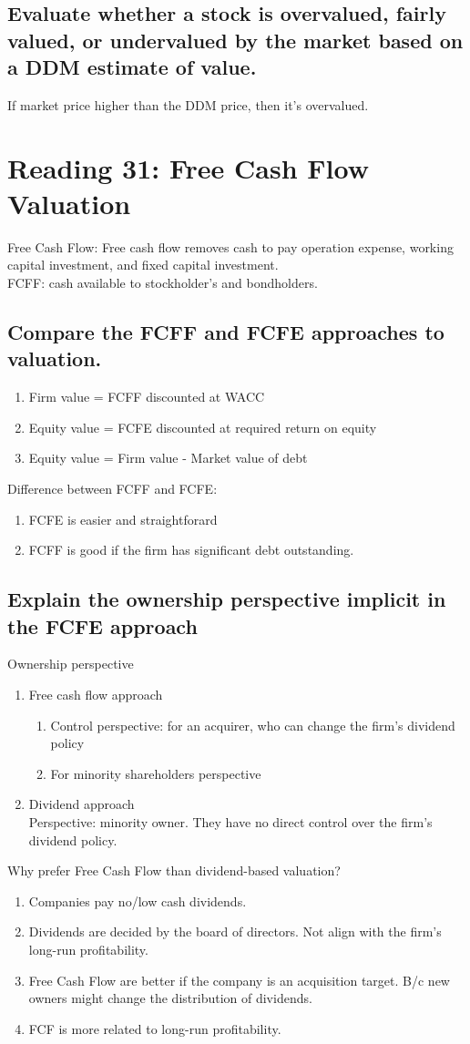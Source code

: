 \documentclass{article}
\newcommand{\be}{\begin{enumerate}}
\newcommand{\ee}{\end{enumerate}}
\begin{document}
\subsection{Evaluate whether a stock is overvalued, fairly valued, or undervalued by the
market based on a DDM estimate of value.}
If market price higher than the DDM price, then it's overvalued. 

\section{Reading 31: Free Cash Flow Valuation}
Free Cash Flow: Free cash flow removes cash to pay operation expense, working capital
investment, and fixed capital investment.\\
FCFF: cash available to stockholder's and bondholders.
\subsection{Compare the FCFF and FCFE approaches to valuation.}
\be
    \item Firm value = FCFF discounted at WACC
    \item Equity value = FCFE discounted at required return on equity
    \item Equity value = Firm value - Market value of debt
\ee
Difference between FCFF and FCFE:
\be
    \item FCFE is easier and straightforard
    \item FCFF is good if the firm has significant debt outstanding.
\ee
\subsection{Explain the ownership perspective implicit in the FCFE approach}
Ownership perspective
\be
    \item Free cash flow approach
        \be
        \item Control perspective: for an acquirer, who can change the firm's dividend policy
        \item For minority shareholders perspective
        \ee
    \item Dividend approach
        \\ Perspective: minority owner. They have no direct control over the firm's dividend
        policy.
\ee
Why prefer Free Cash Flow than dividend-based valuation?
\be
    \item Companies pay no/low cash dividends.
    \item Dividends are decided by the board of directors. Not align with the firm's long-run profitability.
    \item Free Cash Flow are better if the company is an acquisition target. B/c new owners
        might change the distribution of dividends.
    \item FCF is more related to long-run profitability.
\ee
\end{document}
